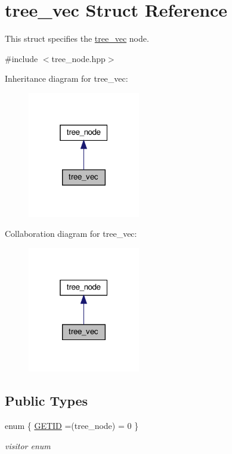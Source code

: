 \hypertarget{structtree__vec}{}\section{tree\+\_\+vec Struct Reference}
\label{structtree__vec}


This struct specifies the \hyperlink{structtree__vec}{tree\+\_\+vec} node.  




{\ttfamily \#include $<$tree\+\_\+node.\+hpp$>$}



Inheritance diagram for tree\+\_\+vec\+:
\nopagebreak
\begin{figure}[H]
\begin{center}
\leavevmode
\includegraphics[width=139pt]{d9/da2/structtree__vec__inherit__graph}
\end{center}
\end{figure}


Collaboration diagram for tree\+\_\+vec\+:
\nopagebreak
\begin{figure}[H]
\begin{center}
\leavevmode
\includegraphics[width=139pt]{d9/d73/structtree__vec__coll__graph}
\end{center}
\end{figure}
\subsection*{Public Types}
\begin{DoxyCompactItemize}
\item 
enum \{ \hyperlink{structtree__vec_af85c857ad38740884cb1ffcf64f981eba1425466f563e52a09816b9e11fa14f0a}{G\+E\+T\+ID} =(tree\+\_\+node) = 0
 \}\begin{DoxyCompactList}\small\item\em visitor enum \end{DoxyCompactList}
\end{DoxyCompactItemize}
